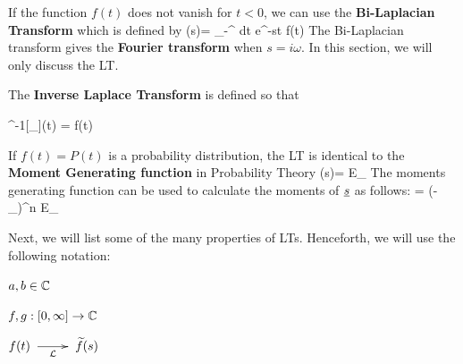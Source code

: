 If the function $f(t)$
does not vanish for $t<0$,
we can use the
{\bf Bi-Laplacian Transform}
which is defined by
\beq
\calb[f](s)=
\int_{-\infty}^\infty
dt\; e^{-st} f(t)
\eeq
The Bi-Laplacian 
transform gives the
{\bf Fourier transform} when 
$s=i\omega$.
In this section,
we will only discuss the LT.


The {\bf Inverse
Laplace Transform}
is defined so that

\beq \call^{-1}[\underbrace{\call[f]}_{}](t)
= f(t)
\eeq



If $f(t)=P(t)$
is a probability
distribution,
the LT 
is identical
to the 
{\bf Moment Generating function} in Probability Theory
\beq
\call[P](s)= E_\rvt[e^{-s\rvt}]
\eeq
The moments
generating function
can be used 
to calculate 
the moments of ${\underline{s}}$ as follows:
\beq
{} = (-\partial_\rvs)^n E_\rvt[e^{-s\rvt}]
\eeq

Next, we 
will list
some of the
many
properties of 
LTs.
Henceforth,
we will
use the following
notation:

$a, b\in{ \mathbb{C}}$

$f,g:[0,\infty]\rightarrow { \mathbb{C}}$

$f(t)\maparrow{\call} \TIL{f}(s)$


